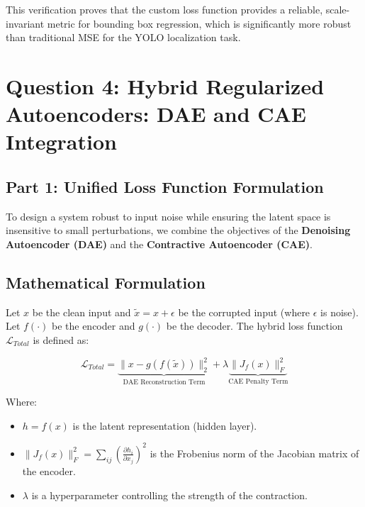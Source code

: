 \documentclass{article}
\begin{document}
This verification proves that the custom loss function provides a reliable, scale-invariant metric for bounding box regression, which is significantly more robust than traditional MSE for the YOLO localization task.


\section{Question 4: Hybrid Regularized Autoencoders: DAE and CAE Integration}

\subsection{Part 1: Unified Loss Function Formulation}
To design a system robust to input noise while ensuring the latent space is insensitive to small perturbations, we combine the objectives of the \textbf{Denoising Autoencoder (DAE)} and the \textbf{Contractive Autoencoder (CAE)}.

\subsection*{Mathematical Formulation}
Let $x$ be the clean input and $\tilde{x} = x + \epsilon$ be the corrupted input (where $\epsilon$ is noise). Let $f(\cdot)$ be the encoder and $g(\cdot)$ be the decoder. The hybrid loss function $\mathcal{L}_{Total}$ is defined as:

\begin{equation}
\mathcal{L}_{Total} = \underbrace{\|x - g(f(\tilde{x}))\|^2_2}_{\text{DAE Reconstruction Term}} + \lambda \underbrace{\|J_f(x)\|_F^2}_{\text{CAE Penalty Term}}
\end{equation}

Where:
\begin{itemize}
	\item $h = f(x)$ is the latent representation (hidden layer).
	\item $\|J_f(x)\|_F^2 = \sum_{ij} \left( \frac{\partial h_i}{\partial x_j} \right)^2$ is the Frobenius norm of the Jacobian matrix of the encoder.
	\item $\lambda$ is a hyperparameter controlling the strength of the contraction.
\end{itemize}
\end{document}
